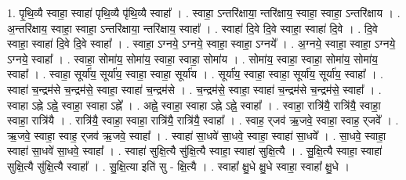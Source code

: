 \documentclass[17pt]{extarticle}
\begin{document}
1. पृ॒थि॒व्यै स्वाहा॒ स्वाहा॑ पृथि॒व्यै पृ॑थि॒व्यै स्वाहा᳚ । . स्वाहा॒ ऽन्तरि॑क्षाया॒ न्तरि॑क्षाय॒ स्वाहा॒ स्वाहा॒ ऽन्तरि॑क्षाय । . अ॒न्तरि॑क्षाय॒ स्वाहा॒ स्वाहा॒ ऽन्तरि॑क्षाया॒ न्तरि॑क्षाय॒ स्वाहा᳚ । . स्वाहा॑ दि॒वे दि॒वे स्वाहा॒ स्वाहा॑ दि॒वे । . दि॒वे स्वाहा॒ स्वाहा॑ दि॒वे दि॒वे स्वाहा᳚ । . स्वाहा॒ ऽग्नये॒ ऽग्नये॒ स्वाहा॒ स्वाहा॒ ऽग्नये᳚ । . अ॒ग्नये॒ स्वाहा॒ स्वाहा॒ ऽग्नये॒ ऽग्नये॒ स्वाहा᳚ । . स्वाहा॒ सोमा॑य॒ सोमा॑य॒ स्वाहा॒ स्वाहा॒ सोमा॑य । . सोमा॑य॒ स्वाहा॒ स्वाहा॒ सोमा॑य॒ सोमा॑य॒ स्वाहा᳚ । . स्वाहा॒ सूर्या॑य॒ सूर्या॑य॒ स्वाहा॒ स्वाहा॒ सूर्या॑य । . सूर्या॑य॒ स्वाहा॒ स्वाहा॒ सूर्या॑य॒ सूर्या॑य॒ स्वाहा᳚ । . स्वाहा॑ च॒न्द्रम॑से च॒न्द्रम॑से॒ स्वाहा॒ स्वाहा॑ च॒न्द्रम॑से । . च॒न्द्रम॑से॒ स्वाहा॒ स्वाहा॑ च॒न्द्रम॑से च॒न्द्रम॑से॒ स्वाहा᳚ । . स्वाहा ऽह्ने ऽह्ने॒ स्वाहा॒ स्वाहा ऽह्ने᳚ । . अह्ने॒ स्वाहा॒ स्वाहा ऽह्ने ऽह्ने॒ स्वाहा᳚ । . स्वाहा॒ रात्रि॑यै॒ रात्रि॑यै॒ स्वाहा॒ स्वाहा॒ रात्रि॑यै । . रात्रि॑यै॒ स्वाहा॒ स्वाहा॒ रात्रि॑यै॒ रात्रि॑यै॒ स्वाहा᳚ । . स्वाह॒ र्‌जव॑ ऋ॒जवे॒ स्वाहा॒ स्वाह॒ र्‌जवे᳚ । . ऋ॒जवे॒ स्वाहा॒ स्वाह॒ र्‌जव॑ ऋ॒जवे॒ स्वाहा᳚ । . स्वाहा॑ सा॒धवे॑ सा॒धवे॒ स्वाहा॒ स्वाहा॑ सा॒धवे᳚ । . सा॒धवे॒ स्वाहा॒ स्वाहा॑ सा॒धवे॑ सा॒धवे॒ स्वाहा᳚ । . स्वाहा॑ सुक्षि॒त्यै सु॑क्षि॒त्यै स्वाहा॒ स्वाहा॑ सुक्षि॒त्यै । . सु॒क्षि॒त्यै स्वाहा॒ स्वाहा॑ सुक्षि॒त्यै सु॑क्षि॒त्यै स्वाहा᳚ । . सु॒क्षि॒त्या इति॑ सु - क्षि॒त्यै । . स्वाहा᳚ क्षु॒धे क्षु॒धे स्वाहा॒ स्वाहा᳚ क्षु॒धे । \newline
\end{document}
